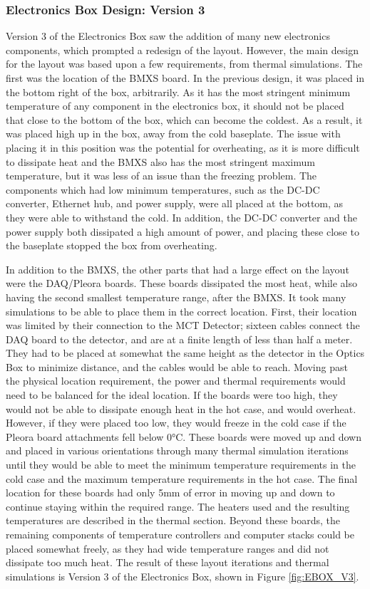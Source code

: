 \subsubsection{Electronics Box Design: Version 3}
Version 3 of the Electronics Box saw the addition of many new electronics components, which prompted a redesign of the layout. However, the main design for the layout was based upon a few requirements, from thermal simulations. The first was the location of the BMXS board. In the previous design, it was placed in the bottom right of the box, arbitrarily. As it has the most stringent minimum temperature of any component in the electronics box, it should not be placed that close to the bottom of the box, which can become the coldest. As a result, it was placed high up in the box, away from the cold baseplate. The issue with placing it in this position was the potential for overheating, as it is more difficult to dissipate heat and the BMXS also has the most stringent maximum temperature, but it was less of an issue than the freezing problem. The components which had low minimum temperatures, such as the DC-DC converter, Ethernet hub, and power supply, were all placed at the bottom, as they were able to withstand the cold. In addition, the DC-DC converter and the power supply both dissipated a high amount of power, and placing these close to the baseplate stopped the box from overheating. 

In addition to the BMXS, the other parts that had a large effect on the layout were the DAQ/Pleora boards. These boards dissipated the most heat, while also having the second smallest temperature range, after the BMXS. It took many simulations to be able to place them in the correct location. First, their location was limited by their connection to the MCT Detector; sixteen cables connect the DAQ board to the detector, and are at a finite length of less than half a meter. They had to be placed at somewhat the same height as the detector in the Optics Box to minimize distance, and the cables would be able to reach. Moving past the physical location requirement, the power and thermal requirements would need to be balanced for the ideal location. If the boards were too high, they would not be able to dissipate enough heat in the hot case, and would overheat. However, if they were placed too low, they would freeze in the cold case if the Pleora board attachments fell below 0°C. These boards were moved up and down and placed in various orientations through many thermal simulation iterations until they would be able to meet the minimum temperature requirements in the cold case and the maximum temperature requirements in the hot case. The final location for these boards had only 5mm of error in moving up and down to continue staying within the required range. The heaters used and the resulting temperatures are described in the thermal section. Beyond these boards, the remaining components of temperature controllers and computer stacks could be placed somewhat freely, as they had wide temperature ranges and did not dissipate too much heat. The result of these layout iterations and thermal simulations is Version 3 of the Electronics Box, shown in Figure \ref{fig:EBOX_V3}.


